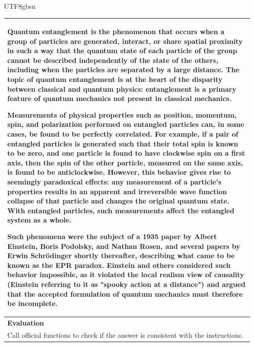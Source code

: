 \documentclass[11pt, a4paper, logo, copyright, nonumbering]{deepseek}
\begin{document}
\begin{CJK*}{UTF8}{gbsn}
\begin{table}[h]
\begin{tabular}{p{}}
Quantum entanglement is the phenomenon that occurs when a group of particles are generated, interact, or share spatial proximity in such a way that the quantum state of each particle of the group cannot be described independently of the state of the others, including when the particles are separated by a large distance. The topic of quantum entanglement is at the heart of the disparity between classical and quantum physics: entanglement is a primary feature of quantum mechanics not present in classical mechanics.

Measurements of physical properties such as position, momentum, spin, and polarization performed on entangled particles can, in some cases, be found to be perfectly correlated. For example, if a pair of entangled particles is generated such that their total spin is known to be zero, and one particle is found to have clockwise spin on a first axis, then the spin of the other particle, measured on the same axis, is found to be anticlockwise. However, this behavior gives rise to seemingly paradoxical effects: any measurement of a particle's properties results in an apparent and irreversible wave function collapse of that particle and changes the original quantum state. With entangled particles, such measurements affect the entangled system as a whole.

Such phenomena were the subject of a 1935 paper by Albert Einstein, Boris Podolsky, and Nathan Rosen, and several papers by Erwin Schrödinger shortly thereafter, describing what came to be known as the EPR paradox. Einstein and others considered such behavior impossible, as it violated the local realism view of causality (Einstein referring to it as "spooky action at a distance") and argued that the accepted formulation of quantum mechanics must therefore be incomplete.\\ \hline
      \textbf{Evaluation}\\
      Call official functions to check if the answer is consistent with the instructions. \\ \hline
    \end{tabular}
\end{table}


\end{CJK*}
\end{document}
